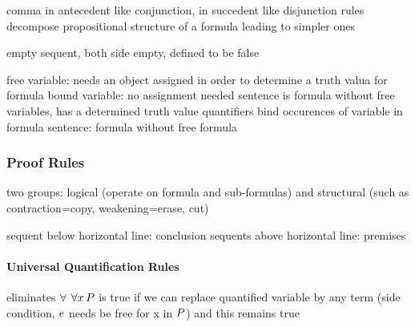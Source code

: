                 comma in antecedent like conjunction, in succedent like disjunction
                rules decompose propositional structure of a formula leading to simpler ones

                empty sequent, both side empty, defined to be false

            free variable: needs an object assigned in order to determine a truth valua for formula
            bound variable: no assignment needed
            sentence is formula without free variables, has a determined truth value
            quantifiers bind occurences of variable in formula
            sentence: formula without free formula



            \subsubsection{Proof Rules}
                \label{sec:FOL-proof-rules}


                two groups: logical (operate on formula and sub-formulas) and structural (such as contraction=copy, weakening=erase, cut)


                sequent below horizontal line: conclusion
                sequents above horizontal line: premises

                \paragraph{Universal Quantification Rules}
                    eliminates $\forall$
                    $\forall x{\,} P$ is true if we can replace quantified variable by any term (side condition, $e$ needs be free for x in $P$) and this remains true

                    \begin{calculus}
                    \end{calculus}

